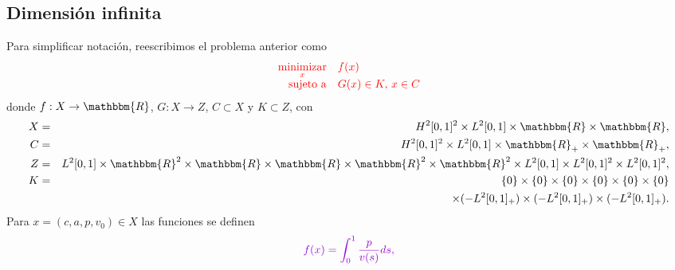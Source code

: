 \documentclass[10pt,mathserif]{beamer}
\newcommand{\R}{\mathbbm{R}}
\newcommand{\arr}{\rightarrow}
\begin{document}
\subsection{Dimensión infinita}
% 
% 
% 
% 
% 
% 

\begin{frame}
Para simplificar notación, reescribimos el problema anterior como
\begin{equation*}
\textcolor{red}{\begin{array}{rl}
\displaystyle \mathop{\mathrm{minimizar}}_{x} & \displaystyle f(x) \\
\mathrm{sujeto \ a} & G(x)\in K,\, x\in C
\end{array}}
\end{equation*}
donde $f:X\arr \R$, $G:X\arr Z$, $C\subset X$ y $K\subset Z$, con
\begin{eqnarray*}
 X&=&H^2[0,1]^2\times L^2[0,1]\times \R \times \R,\\
C&=&H^2[0,1]^2\times L^2[0,1]\times \R_+ \times \R_+,\\
Z&=&L^2[0,1]\times \R^2\times \R\times \R\times \R^2\times \R^2\times L^2[0,1] \times L^2[0,1]^2 \times L^2[0,1]^2,\\
K&=&\{0\}\times \{0\}\times \{0\}\times \{0\}\times \{0\}\times \{0\}\\
   &&\times (-L^2[0,1]_+) \times (-L^2[0,1]_+) \times (-L^2[0,1]_+).
\end{eqnarray*}
Para $x=(c,a,p,v_0)\in X$ las funciones se definen
$$
\textcolor{mymauve}{f(x)=\int_{0}^{1} \frac{p}{v(s)}ds,}
$$
\end{frame}
\end{document}
